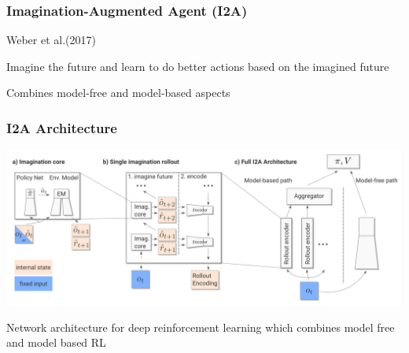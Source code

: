 \PraesentationMasterWeissBlau 
\begin{frame} 

\end{frame} 

\PraesentationMasterStandard


\begin{frame}
    \frametitle{Imagination-Augmented Agent (I2A)}

\begin{PraesentationAufzaehlung}
	\item Weber et al.(2017)
    \item Imagine the future and learn to do better actions based on the imagined future
    \item Combines model-free and model-based aspects
\end{PraesentationAufzaehlung}

\end{frame}
\clearpage

\begin{frame}
    \frametitle{I2A Architecture}


\includegraphics[width=\columnwidth]{./Images/i2a_architecture.png}%
\begin{PraesentationAufzaehlung}
\item Network architecture for deep reinforcement learning which combines model free and model based RL
\end{PraesentationAufzaehlung}
    
\end{frame}
\clearpage

